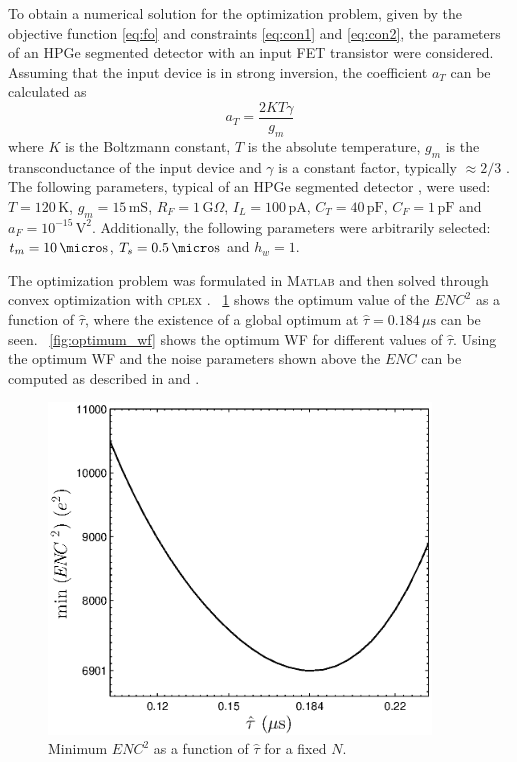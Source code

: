 To obtain a numerical solution for the optimization problem, given by the objective function \eqref{eq:fo} and constraints \eqref{eq:con1} and \eqref{eq:con2}, the parameters of an HPGe segmented detector with an input FET transistor were considered. Assuming that the input device is in strong inversion, the coefficient $a_T$ can be calculated as
	\begin{equation} 
		a_T = \frac{2 K T \gamma}{g_m}
	\end{equation}
where $K$ is the Boltzmann constant, $T$ is the absolute temperature, $g_m$ is the transconductance of the input device and $\gamma$ is a constant factor, typically $\approx 2/3$ \citep{van101}. The following parameters, typical of an HPGe segmented detector \citep{pullia102}, were used: $T = 120\,\text{K}$, $g_m = 15\,\text{mS}$, $R_F = 1\, \text{G}\Omega$, $I_L = 100\,\text{pA}$, $C_T = 40\,\text{pF}$, $C_F = 1\,\text{pF}$ and $a_F = 10^{-15}\,\text{V}^2$. Additionally, the following parameters were arbitrarily selected: $t_m = 10\,\micro \text{s}$, $T_s = 0.5\,\micro\text{s}$ and $h_w = 1$.

The optimization problem was formulated in \textsc{Matlab} and then solved through convex optimization with \textsc{cplex} \citep{cplex}. \figurename~\ref{fig:optimum_tau} shows the optimum value of the $\mathit{ENC}^2$ as a function of $\hat{\tau}$, where the existence of a global optimum at $\hat{\tau} =0.184\,\mu\text{s}$ can be seen. \figurename~\ref{fig:optimum_wf} shows the optimum WF for different values of $\hat{\tau}$. Using the optimum WF and the noise parameters shown above the $\mathit{ENC}$ can be computed as described in \citep{gatti101} and \citep{pullia104}.

\begin{figure}[!t]
	\centering
	\includegraphics[width=4in]{./Figures/optimum_tau.eps}
	\caption{Minimum $\mathit{ENC}^2$ as a function of $\hat{\tau}$ for a fixed $N$.}\label{fig:optimum_tau}
\end{figure}

